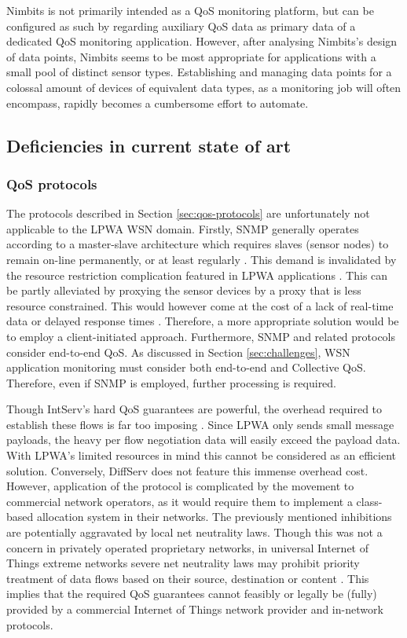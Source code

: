 Nimbits is not primarily intended as a QoS monitoring platform, but can be configured as such by regarding auxiliary QoS data as primary data of a dedicated QoS monitoring application. However, after analysing Nimbits's design of data points, Nimbits seems to be most appropriate for applications with a small pool of distinct sensor types. Establishing and managing data points for a colossal amount of devices of equivalent data types, as a monitoring job will often encompass, rapidly becomes a cumbersome effort to automate.

\subsection{Deficiencies in current state of art}
\subsubsection{QoS protocols}
The protocols described in Section \ref{sec:qos-protocols} are unfortunately not applicable to the LPWA WSN domain. Firstly, SNMP generally operates according to a master-slave architecture \cite{snmp_server_initiated} which requires slaves (sensor nodes) to remain on-line permanently, or at least regularly \cite{snmp_architecture}. This demand is invalidated by the resource restriction complication featured in LPWA applications \cite{key_features}. This can be partly alleviated by proxying the sensor devices by a proxy that is less resource constrained. This would however come at the cost of a lack of real-time data or delayed response times \cite{snmp_proxy}. Therefore, a more appropriate solution would be to employ a client-initiated approach. Furthermore, SNMP and related protocols consider end-to-end QoS. As discussed in Section \ref{sec:challenges}, WSN application monitoring must consider both end-to-end and Collective QoS. Therefore, even if SNMP is employed, further processing is required.

Though IntServ's hard QoS guarantees are powerful, the overhead required to establish these flows is far too imposing \cite{intserv_diffserv_too_complex, qos_challenges}. Since LPWA only sends small message payloads, the heavy per flow negotiation data will easily exceed the payload data. With LPWA's limited resources in mind this cannot be considered as an efficient solution. Conversely, DiffServ does not feature this immense overhead cost. However, application of the protocol is complicated by the movement to commercial network operators, as it would require them to implement a class-based allocation system in their networks. The previously mentioned inhibitions are potentially aggravated by local net neutrality laws. Though this was not a concern in privately operated proprietary networks, in universal Internet of Things extreme networks severe net neutrality laws may prohibit priority treatment of data flows based on their source, destination or content \cite{net_neutrality}. This implies that the required QoS guarantees cannot feasibly or legally be (fully) provided by a commercial Internet of Things network provider and in-network protocols.

